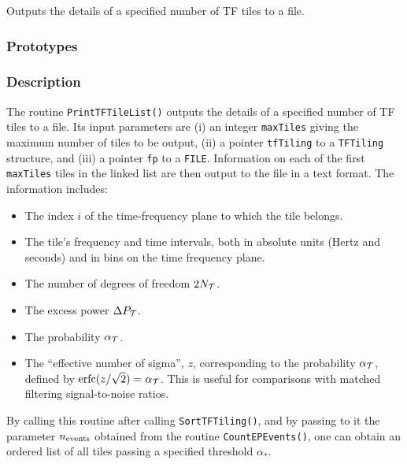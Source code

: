 Outputs the details of a specified number of TF tiles to a file.

\subsubsection*{Prototypes}
\vspace{0.1in}


\subsubsection*{Description}

The routine \verb+PrintTFTileList()+ outputs the details of a specified number
of TF tiles to a file.  Its input parameters are (i) an integer
\verb+maxTiles+ giving the maximum number of tiles to be output, (ii) a
pointer \verb+tfTiling+ to a \verb+TFTiling+ structure, and (iii) a pointer
\verb+fp+ to a \verb+FILE+.  Information on each of the first \verb+maxTiles+
tiles in the linked list are then output to the file in a text format.  The
information includes:
\begin{itemize}

\item The index $i$ of the time-frequency plane
to which the tile belongs.

\item The tile's frequency and time intervals, both in absolute units
(Hertz and seconds) and in bins on the time frequency plane.

\item The number of degrees of freedom $2 N_{\cal T}$.

\item The excess power $\Delta P_{\cal T}$.

\item The probability $\alpha_{\cal T}$.  

\item The ``effective number of sigma'', $z$, corresponding to the
probability $\alpha_{\cal T}$, defined by ${\rm erfc}(z/\sqrt{2}) =
\alpha_{\cal T}$.  This is useful for comparisons with matched
filtering signal-to-noise ratios.

\end{itemize}

By calling this routine after calling \verb+SortTFTiling()+, and by
passing to it the parameter $n_{\rm events}$ obtained from the routine
\verb+CountEPEvents()+, one can obtain an ordered list of all tiles
passing a specified threshold $\alpha_*$.

